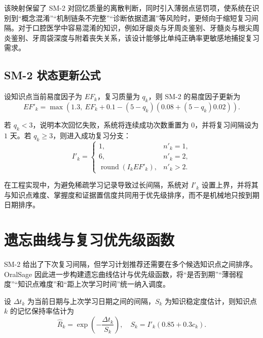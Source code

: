 该映射保留了 SM-2 对回忆质量的离散判断，同时引入薄弱点惩罚项，使系统在识别到“概念混淆”“机制链条不完整”“诊断依据遗漏”等风险时，更倾向于缩短复习间隔。对于口腔医学中容易混淆的知识，例如牙龈炎与牙周炎鉴别、牙髓炎与根尖周炎鉴别、牙周袋深度与附着丧失关系，该设计能够比单纯正确率更敏感地捕捉复习需求。

\subsection{SM-2 状态更新公式}

设知识点当前易度因子为 $EF_k$，复习质量为 $q_k$，则 SM-2 的易度因子更新为
\begin{equation}
  EF'_k = \max\left(1.3,\ EF_k + 0.1 - (5-q_k)\left(0.08+(5-q_k)0.02\right)\right).
  \label{eq:sm2-ef}
\end{equation}

若 $q_k<3$，说明本次回忆失败，系统将连续成功次数重置为 $0$，并将复习间隔设为 $1$ 天。若 $q_k\ge3$，则进入成功复习分支：
\begin{equation}
  I'_k =
  \begin{cases}
  1, & n'_k=1,\\
  6, & n'_k=2,\\
  \operatorname{round}(I_k EF'_k), & n'_k>2.
  \end{cases}
  \label{eq:sm2-interval}
\end{equation}

在工程实现中，为避免稀疏学习记录导致过长间隔，系统对 $I'_k$ 设置上界，并将其与知识点难度、掌握度和证据置信度共同用于优先级排序，而不是机械地只按到期日期排序。

\section{遗忘曲线与复习优先级函数}

SM-2 给出了下次复习间隔，但学习计划推荐还需要在多个候选知识点之间排序。OralSage 因此进一步构建遗忘曲线估计与优先级函数，将“是否到期”“薄弱程度”“知识点难度”和“距上次学习时间”统一纳入调度。

设 $\Delta t_k$ 为当前日期与上次学习日期之间的间隔，$S_k$ 为知识稳定度估计，则知识点 $k$ 的记忆保持率估计为
\begin{equation}
  \hat R_k = \exp\left(-\frac{\Delta t_k}{S_k}\right),
  \quad
  S_k = I'_k(0.85+0.3c_k).
  \label{eq:retention-estimate}
\end{equation}

